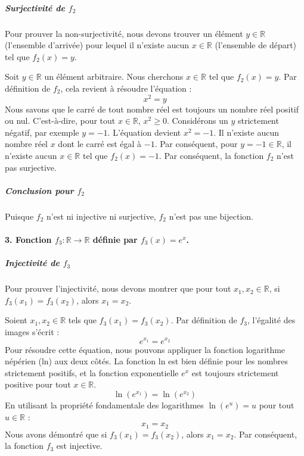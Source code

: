 \documentclass[12pt,a4paper]{report}
\begin{document}
\subparagraph{\texorpdfstring{Surjectivité de
\(f_2\)}{Surjectivité de f\_2}}\label{surjectivituxe9-de-f_2}

Pour prouver la non-surjectivité, nous devons trouver un élément
\(y \in \mathbb{R}\) (l'ensemble d'arrivée) pour lequel il n'existe
aucun \(x \in \mathbb{R}\) (l'ensemble de départ) tel que
\(f_2(x) = y\).

Soit \(y \in \mathbb{R}\) un élément arbitraire. Nous cherchons
\(x \in \mathbb{R}\) tel que \(f_2(x) = y\). Par définition de \(f_2\),
cela revient à résoudre l'équation : \[x^2 = y\] Nous savons que le
carré de tout nombre réel est toujours un nombre réel positif ou nul.
C'est-à-dire, pour tout \(x \in \mathbb{R}\), \(x^2 \ge 0\). Considérons
un \(y\) strictement négatif, par exemple \(y = -1\). L'équation devient
\(x^2 = -1\). Il n'existe aucun nombre réel \(x\) dont le carré est égal
à \(-1\). Par conséquent, pour \(y = -1 \in \mathbb{R}\), il n'existe
aucun \(x \in \mathbb{R}\) tel que \(f_2(x) = -1\). Par conséquent, la
fonction \(f_2\) n'est pas surjective.

\subparagraph{\texorpdfstring{Conclusion pour
\(f_2\)}{Conclusion pour f\_2}}\label{conclusion-pour-f_2}

Puisque \(f_2\) n'est ni injective ni surjective, \(f_2\) n'est pas une
bijection.

\paragraph{\texorpdfstring{3. Fonction
\(f_3: \mathbb{R} \to \mathbb{R}\) définie par
\(f_3(x) = e^x\).}{3. Fonction f\_3: \textbackslash mathbb\{R\} \textbackslash to \textbackslash mathbb\{R\} définie par f\_3(x) = e\^{}x.}}\label{fonction-f_3-mathbbr-to-mathbbr-duxe9finie-par-f_3x-ex.}

\subparagraph{\texorpdfstring{Injectivité de
\(f_3\)}{Injectivité de f\_3}}\label{injectivituxe9-de-f_3}

Pour prouver l'injectivité, nous devons montrer que pour tout
\(x_1, x_2 \in \mathbb{R}\), si \(f_3(x_1) = f_3(x_2)\), alors
\(x_1 = x_2\).

Soient \(x_1, x_2 \in \mathbb{R}\) tels que \(f_3(x_1) = f_3(x_2)\). Par
définition de \(f_3\), l'égalité des images s'écrit :
\[e^{x_1} = e^{x_2}\] Pour résoudre cette équation, nous pouvons
appliquer la fonction logarithme népérien (ln) aux deux côtés. La
fonction ln est bien définie pour les nombres strictement positifs, et
la fonction exponentielle \(e^x\) est toujours strictement positive pour
tout \(x \in \mathbb{R}\). \[\ln(e^{x_1}) = \ln(e^{x_2})\] En utilisant
la propriété fondamentale des logarithmes \(\ln(e^u) = u\) pour tout
\(u \in \mathbb{R}\) : \[x_1 = x_2\] Nous avons démontré que si
\(f_3(x_1) = f_3(x_2)\), alors \(x_1 = x_2\). Par conséquent, la
fonction \(f_3\) est injective.
\end{document}
